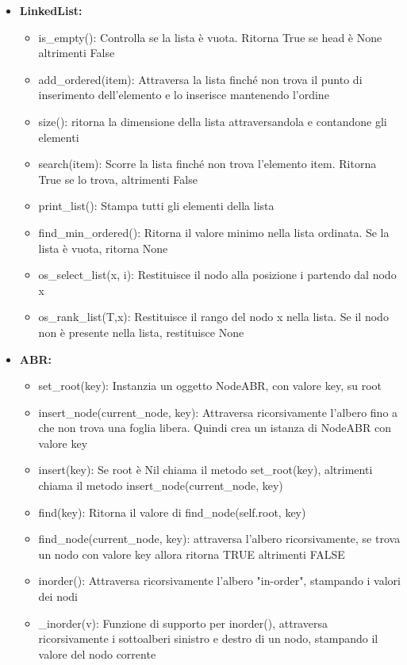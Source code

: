 \documentclass{article}
\begin{document}
\begin{itemize}
    \item \textbf{LinkedList: }
    \begin{itemize}
        \item is\_empty(): Controlla se la lista è vuota. Ritorna True se head è None altrimenti False
        \item add\_ordered(item): Attraversa la lista finché non trova il punto di inserimento dell'elemento e lo inserisce mantenendo l'ordine
        \item size(): ritorna la dimensione della lista attraversandola e contandone gli elementi
        \item search(item): Scorre la lista finché non trova l'elemento item. Ritorna True se lo trova, altrimenti False
        \item print\_list(): Stampa tutti gli elementi della lista 
        \item find\_min\_ordered(): Ritorna il valore minimo nella lista ordinata. Se la lista è vuota, ritorna None
        \item os\_select\_list(x, i): Restituisce il nodo alla posizione i partendo dal nodo x 
        \item os\_rank\_list(T,x): Restituisce il rango del nodo x nella lista. Se il nodo non è presente nella lista, restituisce None
    \end{itemize}
    \newpage
    \item \textbf{ABR: }
    \begin{itemize}
        \item set\_root(key):  Instanzia un oggetto NodeABR, con valore key, su root
        \item insert\_node(current\_node, key): Attraversa ricorsivamente l’albero fino a che non trova una foglia libera. Quindi crea un istanza di NodeABR con valore key
        \item insert(key): Se root è Nil chiama il metodo set\_root(key), altrimenti chiama il metodo insert\_node(current\_node, key)
        \item find(key): Ritorna il valore di find\_node(self.root, key)
        \item find\_node(current\_node, key): attraversa l’albero ricorsivamente, se trova un nodo con valore key allora ritorna TRUE altrimenti FALSE
        \item inorder(): Attraversa ricorsivamente l'albero "in-order", stampando i valori dei nodi
        \item \_inorder(v): Funzione di supporto per inorder(), attraversa ricorsivamente i sottoalberi sinistro e destro di un nodo, stampando il valore del nodo corrente

\end{itemize}
\end{itemize}
\end{document}
